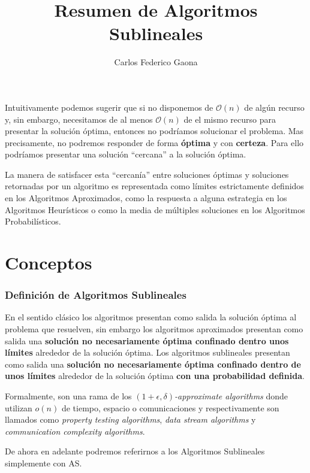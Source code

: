 \documentclass[10pt,a4paper]{article}
\author{Carlos Federico Gaona}
\title{Resumen de Algoritmos Sublineales}
\date{}
\renewcommand{\O}[1]{$\mathcal{O}(#1)$}
\renewcommand{\o}[1]{$o(#1)$}
\begin{document}
\maketitle

Intuitivamente podemos sugerir que si no disponemos de \O{n} de algún recurso y, sin embargo, necesitamos de al menos \O{n} de el mismo recurso para presentar la solución óptima, entonces no podríamos solucionar el problema. Mas precisamente, no podremos responder de forma \textbf{óptima} y con \textbf{certeza}. Para ello podríamos presentar una solución ``cercana'' a la solución óptima.

La manera de satisfacer esta ``cercanía'' entre soluciones óptimas y soluciones retornadas por un algoritmo es representada como límites estrictamente definidos en los Algoritmos Aproximados, como la respuesta a alguna estrategia en los Algoritmos Heurísticos o como la media de múltiples soluciones en los Algoritmos Probabilísticos.


\part{Conceptos}
\section{Definición de Algoritmos Sublineales}
En el sentido clásico los algoritmos presentan como salida la solución óptima al problema que resuelven, sin embargo los algoritmos aproximados presentan como salida una \textbf{solución no necesariamente óptima confinado dentro unos límites} alrededor de la solución óptima. Los algoritmos sublineales presentan como salida una \textbf{solución no necesariamente óptima confinado dentro de unos límites} alrededor de la solución óptima \textbf{con una probabilidad definida}.

Formalmente, son una rama de los $(1+\epsilon, \delta)$\textit{-approximate algorithms} donde utilizan \o{n} de tiempo, espacio o comunicaciones y respectivamente son llamados como \textit{property testing algorithms}, \textit{data stream algorithms} y \textit{communication complexity algorithms}.

De ahora en adelante podremos referirnos a los Algoritmos Sublineales simplemente con AS.
\end{document}

